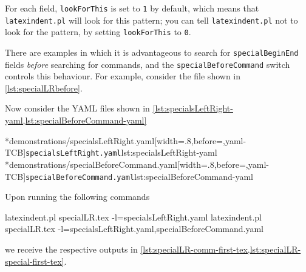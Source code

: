 	For each field, \texttt{lookForThis} is set to \texttt{1} by default,
	which means that \texttt{latexindent.pl} will look for this pattern; you can tell
	\texttt{latexindent.pl} not to look for the pattern, by setting \texttt{lookForThis}
	to \texttt{0}.

	There are%
	 examples in which it
	is advantageous to search for \texttt{specialBeginEnd} fields \emph{before}
	searching for commands, and the \texttt{specialBeforeCommand} switch controls this behaviour.
	For example, consider the file shown in \cref{lst:specialLRbefore}.


	Now consider the YAML files shown in \cref{lst:specialsLeftRight-yaml,lst:specialBeforeCommand-yaml}

	\begin{cmhtcbraster}
		\cmhlistingsfromfile[]*{demonstrations/specialsLeftRight.yaml}[width=.8\linewidth,before=\centering,yaml-TCB]{\texttt{specialsLeftRight.yaml}}{lst:specialsLeftRight-yaml}
		\cmhlistingsfromfile[]*{demonstrations/specialBeforeCommand.yaml}[width=.8\linewidth,before=\centering,yaml-TCB]{\texttt{specialBeforeCommand.yaml}}{lst:specialBeforeCommand-yaml}
	\end{cmhtcbraster}

	Upon running the following commands
	\begin{widepage}
		\begin{commandshell}
latexindent.pl specialLR.tex -l=specialsLeftRight.yaml      
latexindent.pl specialLR.tex -l=specialsLeftRight.yaml,specialBeforeCommand.yaml      
\end{commandshell}
	\end{widepage}
	we receive the respective outputs in \cref{lst:specialLR-comm-first-tex,lst:specialLR-special-first-tex}.

	\begin{minipage}{.49\linewidth}
	\end{minipage}
	\hfill
	\begin{minipage}{.49\linewidth}
	\end{minipage}

